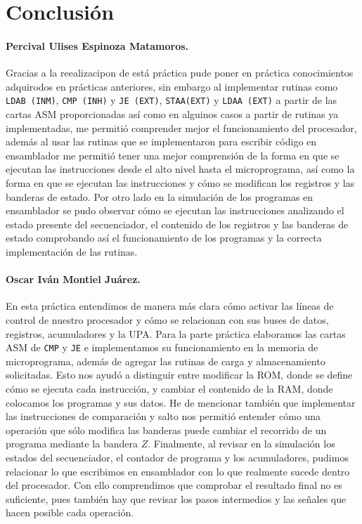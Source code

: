 \documentclass[letterpaper,12pt]{article}
\begin{document}
\section{Conclusión}

\paragraph{Percival Ulises Espinoza Matamoros.} Gracias a la reealizacipon de está práctica pude poner en práctica conocimientos adquirodos en prácticas anteriores, sin embargo al implementar rutinas como \texttt{LDAB (INM)}, \texttt{CMP (INH)} y \texttt{JE (EXT)}, \texttt{STAA(EXT)} y \texttt{LDAA (EXT)} a partir de las cartas ASM proporcionadas así como en alguinos casos a partir de rutinas ya implementadas, me permitió comprender mejor el funcionamiento del procesador, además al usar las rutinas que se implementaron para escribir código en ensamblador me permitió tener una mejor comprensión de la forma en que se ejecutan las instrucciones desde el alto nivel hasta el microprograma, así como la forma en que se ejecutan las instrucciones y cómo se modifican los registros y las banderas de estado. Por otro lado en la simulación de los programas en ensamblador se pudo observar cómo se ejecutan las instrucciones analizando el estado presente del secuenciador, el contenido de los registros y las banderas de estado comprobando así el funcionamiento de los programas y la correcta implementación de las rutinas.

\paragraph{Oscar Iván Montiel Juárez.} En esta práctica entendimos de manera más clara cómo activar las líneas de control de nuestro procesador y cómo se relacionan con sus buses de datos, registros, acumuladores y la UPA. Para la parte práctica elaboramos las cartas ASM de \texttt{CMP} y \texttt{JE} e implementamos su funcionamiento en la memoria de microprograma, además de agregar las rutinas de carga y almacenamiento solicitadas. Esto nos ayudó a distinguir entre modificar la ROM, donde se define cómo se ejecuta cada instrucción, y cambiar el contenido de la RAM, donde colocamos los programas y sus datos. He de mencionar también que implementar las instrucciones de comparación y salto nos permitió entender cómo una operación que sólo modifica las banderas puede cambiar el recorrido de un programa mediante la bandera $Z$. Finalmente, al revisar en la simulación los estados del secuenciador, el contador de programa y los acumuladores, pudimos relacionar lo que escribimos en ensamblador con lo que realmente sucede dentro del procesador. Con ello comprendimos que comprobar el resultado final no es suficiente, pues también hay que revisar los pasos intermedios y las señales que hacen posible cada operación.
\end{document}
